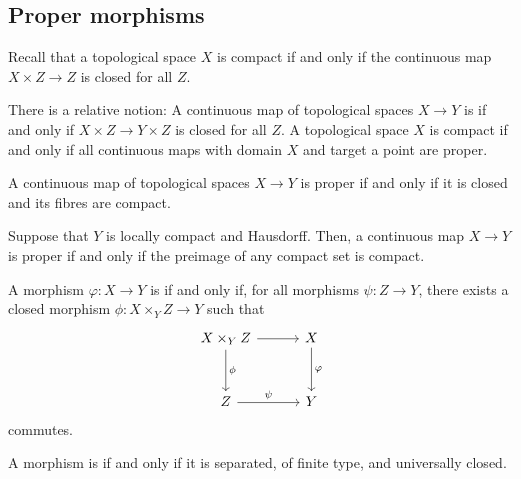 \documentclass [11 pt, oneside] {article}
\begin{document}
\subsection{Proper morphisms}
Recall that a topological space $X$ is compact if and only if the continuous map $X\times Z\longrightarrow Z$ is closed for all $Z$.

There is a relative notion: A continuous map of topological spaces $X\longrightarrow Y$ is  if and only if $X\times Z\longrightarrow Y\times Z$ is closed for all $Z$. A topological space $X$ is compact if and only if all continuous maps with domain $X$ and target a point are proper.

\begin{remark}[ ]\label{}\text{}
A continuous map of topological spaces $X\longrightarrow Y$ is proper if and only if it is closed and its fibres are compact.
\end{remark}

\begin{remark}
	Suppose that $Y$ is locally compact and Hausdorff. Then, a continuous map $X\longrightarrow Y$ is proper if and only if the preimage of any compact set is compact. 
\end{remark}

\begin{definition}[ ]\label{}\text{}
A morphism $\varphi : X\longrightarrow Y$ is  if and only if, for all morphisms $\psi : Z\longrightarrow Y$, there exists a closed morphism $\phi:X\times_Y Z\longrightarrow Y$ such that
\[
	\begin{tikzcd}[row sep = 3 em, column sep = 3 em]
		X \times_Y Z \ar[d, "\phi"] \ar[r] & X\ar[d, "\varphi"]\\Z\ar[r,"\psi"] & Y
	\end{tikzcd}	
\]
commutes.
\end{definition}

\begin{definition}[ ]\label{}\text{}
A morphism is  if and only if it is separated, of finite type, and universally closed.
\end{definition}
\end{document}
